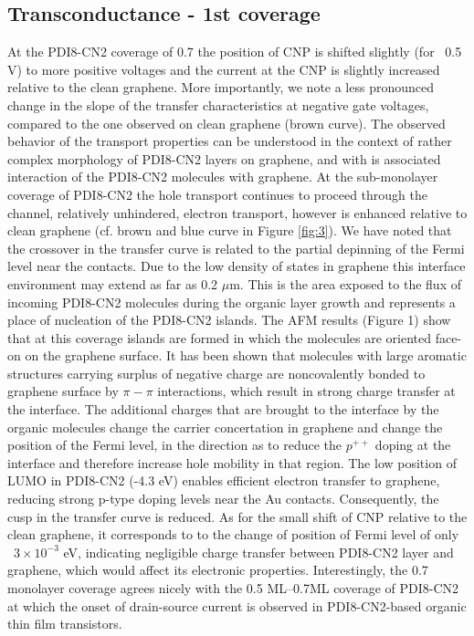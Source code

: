 \documentclass[preprint,aip,jap]{revtex4-2}
\begin{document}
\subsection{Transconductance - 1st coverage}
\label{sec:first}

At the PDI8-CN2 coverage of 0.7 the position of CNP is shifted slightly (for ~0.5 V)  to more positive voltages and the current at the CNP is slightly increased relative to the clean graphene.  More importantly, we note a less pronounced change in the slope of the transfer characteristics at negative gate voltages, compared to the one observed on clean graphene (brown curve). The observed behavior of the transport properties can be understood in the context of rather complex morphology of PDI8-CN2 layers on graphene, and with is associated interaction of the PDI8-CN2 molecules with graphene. At the sub-monolayer coverage of PDI8-CN2 the hole transport continues to proceed through the channel, relatively unhindered, electron transport, however is enhanced relative to clean graphene (cf. brown and blue curve in Figure \ref{fig:3}). We have noted that the crossover in the transfer curve is related to the partial depinning of the Fermi level near the contacts. Due to the low density of states in graphene this interface environment may extend as far as 0.2 $\mu$m\cite{mueller-2009}. This is the area exposed to the flux of incoming PDI8-CN2 molecules during the organic layer growth and represents a place of nucleation of the PDI8-CN2 islands. The AFM results (Figure 1) show that at this coverage islands are formed in which the molecules are oriented face-on on the graphene surface. It has been shown\cite{su-2009} that molecules with large aromatic structures carrying surplus of negative charge are noncovalently bonded to graphene surface by $\pi-\pi$ interactions, which result in strong charge transfer at the interface. The additional charges that are brought to the interface by the organic molecules change the carrier concertation in graphene and change the position of the Fermi level, in the direction as to reduce the $p^{++}$ doping at the interface and therefore increase hole mobility in that region. The low position of LUMO in PDI8-CN2 (-4.3 eV)\cite{jones-2007} enables efficient electron transfer to graphene, reducing strong p-type doping levels near the Au contacts. Consequently, the cusp in the transfer curve is reduced.   As for the small shift of CNP relative to the clean graphene, it corresponds to to the change of position of Fermi level of only ~$3\times10^{-3}$ eV, indicating negligible charge transfer between PDI8-CN2 layer and graphene, which would affect its electronic properties. Interestingly, the 0.7 monolayer coverage agrees nicely with the 0.5 ML--0.7ML coverage of PDI8-CN2 at which the onset of  drain-source current is observed in PDI8-CN2-based organic thin film transistors\cite{liscio-2013}. 
\end{document}

